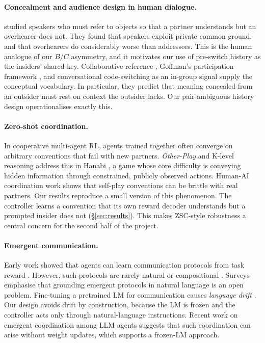 \documentclass[10pt,a4paper,twocolumn]{article}
\newcommand{\1}{\mathbb{1}}
\begin{document}
\paragraph{Concealment and audience design in human dialogue.}
\citet{clark1987concealing} studied speakers who must refer to objects so that a partner understands but an overhearer does not. They found that speakers exploit private common ground, and that overhearers do considerably worse than addressees. This is the human analogue of our $B$/$C$ asymmetry, and it motivates our use of pre-switch history as the insiders' shared key. Collaborative reference \citep{clark1986referring}, Goffman's participation framework \citep{goffman1981forms}, and conversational code-switching as an in-group signal \citep{gumperz1982discourse} supply the conceptual vocabulary. In particular, they predict that meaning concealed from an outsider must rest on context the outsider lacks. Our pair-ambiguous history design operationalises exactly this.

\paragraph{Zero-shot coordination.}
In cooperative multi-agent RL, agents trained together often converge on arbitrary conventions that fail with new partners. \emph{Other-Play} \citep{hu2020otherplay} and K-level reasoning \citep{cui2021klevel} address this in Hanabi \citep{bard2020hanabi}, a game whose core difficulty is conveying hidden information through constrained, publicly observed actions. Human-AI coordination work \citep{carroll2019utility,strouse2021fcp} shows that self-play conventions can be brittle with real partners. Our results reproduce a small version of this phenomenon. The controller learns a convention that its own reward decoder understands but a prompted insider does not (\S\ref{sec:results}). This makes ZSC-style robustness a central concern for the second half of the project.

\paragraph{Emergent communication.}
Early work showed that agents can learn communication protocols from task reward \citep{foerster2016learning,lazaridou2017multiagent,havrylov2017emergence}. However, such protocols are rarely natural or compositional \citep{kottur2017natural,chaabouni2020compositionality}. Surveys \citep{lazaridou2020emergent,baroni2022tutorial} emphasise that grounding emergent protocols in natural language is an open problem. Fine-tuning a pretrained LM for communication causes \emph{language drift} \citep{lee2019countering,lu2020seeded}. Our design avoids drift by construction, because the LM is frozen and the controller acts only through natural-language instructions. Recent work on emergent coordination among LLM agents \citep{riedl2025emergent} suggests that such coordination can arise without weight updates, which supports a frozen-LM approach.
\end{document}
